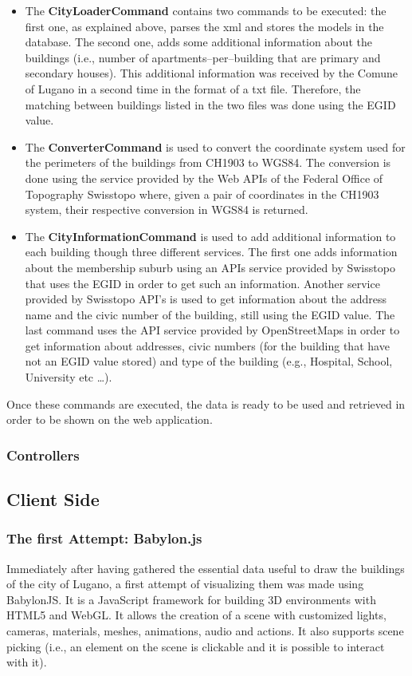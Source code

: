 \begin{itemize}
	\item The {\bf CityLoaderCommand} contains two commands to be executed: the first one, as explained above, parses the xml and stores the models in the database. The second one, adds some additional information about the buildings (i.e., number of apartments--per--building that are primary and secondary houses). This additional information was received by the Comune of Lugano in a second time in the format of a txt file. Therefore, the matching between buildings listed in the two files was done using the EGID value. 
	\item The {\bf ConverterCommand} is used to convert the coordinate system used for the perimeters of the buildings from CH1903 to WGS84. The conversion is done using the service provided by the Web APIs of the Federal Office of Topography Swisstopo  where, given a pair of coordinates in the CH1903 system, their respective conversion in WGS84 is returned.
	\item The {\bf CityInformationCommand} is used to add additional information to each building though three different services. The first one adds information about the membership suburb using an APIs service provided by Swisstopo that uses the EGID in order to get such an information. Another service provided by Swisstopo API's is used to get information about the address name and the civic number of the building, still using the EGID value. The last command uses the API service provided by OpenStreetMaps in order to get information about addresses, civic numbers (for the building that have not an EGID value stored) and type of the building (e.g., Hospital, School, University etc \dots).  
\end{itemize}
Once these commands are executed, the data is ready to be used and retrieved in order to be shown on the web application.
\subsubsection{Controllers}
\subsection{Client Side}
\subsubsection{The first Attempt: Babylon.js}
Immediately after having gathered the essential data useful to draw the buildings of the city of Lugano, a first attempt of visualizing them was made using BabylonJS. It is a JavaScript framework for building 3D environments with HTML5 and WebGL. It allows the creation of a scene with customized lights, cameras, materials, meshes, animations, audio and actions. It also supports scene picking (i.e., an element on the scene is clickable and it is possible to interact with it).\\

